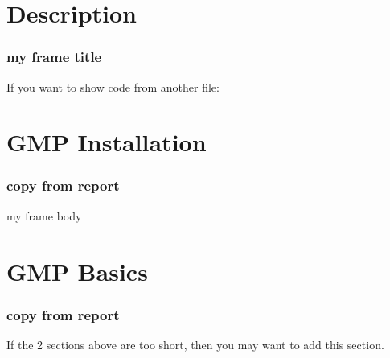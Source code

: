 \section{\cry{} Description}

\begin{frame}
\frametitle{my frame title}
If you want to show code from another file:
\end{frame}


\section{GMP Installation}

\begin{frame}
\frametitle{copy from report}
my frame body
\end{frame}


\section{GMP Basics}

\begin{frame}
\frametitle{copy from report}
If the 2 sections above are too short,
then you may want to add this section.
\end{frame}
